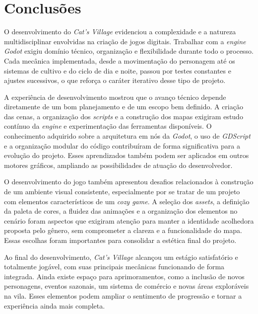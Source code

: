 \chapter{Conclusões}
\label{cap:05}

O desenvolvimento do \textit{Cat’s Village} evidenciou a complexidade e a natureza multidisciplinar envolvidas na criação de jogos digitais. Trabalhar com a  \textit{engine Godot} exigiu domínio técnico, organização e flexibilidade durante todo o processo. Cada mecânica implementada, desde a movimentação do personagem até os sistemas de cultivo e do ciclo de dia e noite, passou por testes constantes e ajustes sucessivos, o que reforça o caráter iterativo desse tipo de projeto.

A experiência de desenvolvimento mostrou que o avanço técnico depende diretamente de um bom planejamento e de um escopo bem definido. A criação das cenas, a organização dos \textit{scripts} e a construção dos mapas exigiram estudo contínuo da \textit{engine} e experimentação das ferramentas disponíveis. O conhecimento adquirido sobre a arquitetura em nós da \textit{Godot}, o uso de \textit{GDScript} e a organização modular do código contribuíram de forma significativa para a evolução do projeto. Esses aprendizados também podem ser aplicados em outros motores gráficos, ampliando as possibilidades de atuação do desenvolvedor.

O desenvolvimento do jogo também apresentou desafios relacionados à construção de um ambiente visual consistente, especialmente por se tratar de um projeto com elementos característicos de um \textit{cozy game}. A seleção dos \textit{assets}, a definição da paleta de cores, a fluidez das animações e a organização dos elementos no cenário foram aspectos que exigiram atenção para manter a identidade acolhedora proposta pelo gênero, sem comprometer a clareza e a funcionalidade do mapa. Essas escolhas foram importantes para consolidar a estética final do projeto.

Ao final do desenvolvimento, \textit{Cat’s Village} alcançou um estágio satisfatório e totalmente jogável, com suas principais mecânicas funcionando de forma integrada. Ainda existe espaço para aprimoramentos, como a inclusão de novos personagens, eventos sazonais, um sistema de comércio e novas áreas exploráveis na vila. Esses elementos podem ampliar o sentimento de progressão e tornar a experiência ainda mais completa.